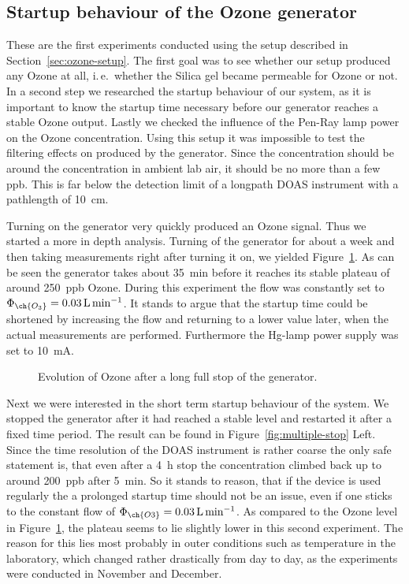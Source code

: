 \subsection{Startup behaviour of the Ozone generator}
\label{sec:ozone}

These are the first experiments conducted using the setup described in
Section~\ref{sec:ozone-setup}. The first goal was to see whether our
setup produced any Ozone at all, i.\,e.\ whether the Silica gel became
permeable for Ozone or not. In a second step we researched the startup
behaviour of our system, as it is important to know the startup time
necessary before our generator reaches a stable Ozone output. Lastly
we checked the influence of the Pen-Ray lamp power on the Ozone
concentration. Using this setup it was impossible to test the
filtering effects on  produced by the generator. Since the
concentration should be around the  concentration in ambient
lab air, it should be no more than a few \si{ppb}. This is far below
the detection limit of a longpath DOAS instrument with a pathlength of
\SI{10}{\centi\meter}. 

Turning on the generator very quickly produced an Ozone signal. Thus
we started a more in depth analysis. Turning of the generator for
about a week and then taking measurements right after turning it on,
we yielded Figure~\ref{fig:long-stop}. As can be seen the generator
takes about \SI{35}{\minute} before it reaches its stable plateau of
around \SI{250}{ppb} Ozone. During this experiment the flow was
constantly set to $\Phi_{\ch{O_3}} = \SI{0.03}{\liter\per\minute}$. It
stands to argue that the startup time could be shortened by increasing
the flow and returning to a lower value later, when the actual 
measurements are performed. Furthermore the Hg-lamp power supply was
set to \SI{10}{\milli\ampere}.

\begin{figure}[htbp]
  \centering
  
  \caption{Evolution of Ozone after a long full stop of the
    generator.}
  \label{fig:long-stop}
\end{figure}

Next we were interested in the short term startup behaviour of the
system. We stopped the generator after it had reached a stable level
and restarted it after a fixed time period. The result can be found in
Figure~\ref{fig:multiple-stop} Left. Since the time resolution of the DOAS
instrument is rather coarse the only safe statement is, that even
after a \SI{4}{\hour} stop the concentration climbed back up to around
\SI{200}{ppb} after \SI{5}{\minute}. So it stands to reason, that if
the device is used regularly the a prolonged startup time should not
be an issue, even if one sticks to the constant flow of
$\Phi_{\ch{O3}} = \SI{0.03}{\liter\per\minute}$. As compared to the
Ozone level in Figure~\ref{fig:long-stop}, the plateau seems to lie
slightly lower in this second experiment. The reason for this lies
most probably in outer conditions such as temperature in the
laboratory, which changed rather drastically from day to day, as the
experiments were conducted in November and December.

